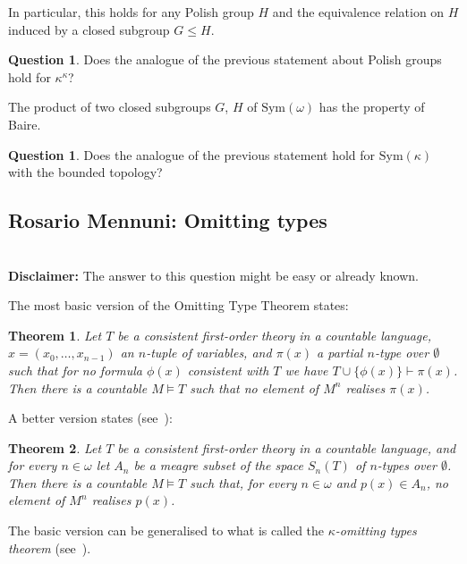 \documentclass{amsart}
\newtheorem*{theorem*}{Theorem}
\theoremstyle{definition}
\newtheorem{question}[theorem]{Question}
\newcommand{\set}[1]{\lbrace#1\rbrace}
\begin{document}
In particular, this holds for any Polish group $H$ and the equivalence relation on $H$ induced by a closed subgroup $G\leq H$. 

\begin{question} 
Does the analogue of the previous statement about Polish groups hold for $\kappa^\kappa$? 
\end{question} 

The product of two closed subgroups $G$, $H$ of $\mathrm{Sym}(\omega)$ has the property of Baire. 

\begin{question} 
Does the analogue of the previous statement hold for $\mathrm{Sym}(\kappa)$ with the bounded topology? 
\end{question} 


\subsection{Rosario Mennuni: Omitting types} \ \\ 

\noindent 
{\bf Disclaimer:}
The answer to this question might be easy or already known.

\smallskip 
The most basic version of the Omitting Type Theorem states:
\begin{theorem*}
  Let $T$ be a  consistent first-order theory in a countable language, $x=(x_0,\ldots,x_{n-1})$ an $n$-tuple of variables, and $\pi(x)$ a partial $n$-type over $\emptyset$ such that for no formula $\phi(x)$ consistent with $T$ we have $T\cup \set{\phi(x)}\vdash \pi(x)$. Then there is a countable  $M\models T$ such that no element of $M^n$ realises $\pi(x)$.
\end{theorem*}

A better version states (see~\cite[Theorem~10.3]{poizat}):

\begin{theorem*}\label{thm:ott_meagre}
  Let $T$ be a consistent first-order theory in a countable language, and for every $n\in \omega$ let $A_n$ be a meagre subset of the space $S_n(T)$ of $n$-types over $\emptyset$. Then there is a countable $M\models T$ such that, for every $n\in \omega$ and $p(x)\in A_n$, no element of $M^n$ realises $p(x)$.
\end{theorem*}

The basic version can be generalised to what is called the \emph{$\kappa$-omitting types theorem} (see~\cite[Theorem~2.2.19]{changkeisler}).
\end{document}
